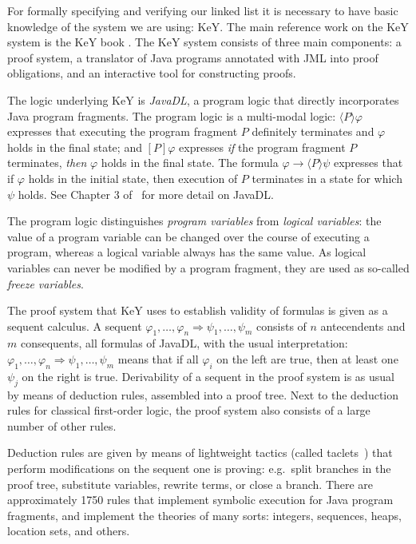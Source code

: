 \documentclass[runningheads]{llncs}
\begin{document}
For formally specifying and verifying our linked list it is necessary to have basic knowledge of the system we are using: KeY. The main reference work on the KeY system is the KeY book \cite{KeYbook}. The KeY system consists of three main components: a proof system, a translator of Java programs annotated with JML into proof obligations, and an interactive tool for constructing proofs.

The logic underlying KeY is \emph{JavaDL}, a program logic that directly incorporates Java program fragments.
The program logic is a multi-modal logic: $\langle P\rangle\varphi$ expresses that executing the program fragment $P$ definitely terminates and $\varphi$ holds in the final state; and $[P]\varphi$ expresses \emph{if} the program fragment $P$ terminates, \emph{then} $\varphi$ holds in the final state. The formula $\varphi\to\langle P\rangle\psi$ expresses that if $\varphi$ holds in the initial state, then execution of $P$ terminates in a state for which $\psi$ holds.  See Chapter 3 of~\cite{KeYbook} for more detail on JavaDL.

The program logic distinguishes \emph{program variables} from \emph{logical variables}: the value of a program variable can be changed over the course of executing a program, whereas a logical variable always has the same value. As logical variables can never be modified by a program fragment, they are used as so-called \emph{freeze variables}.

The proof system that KeY uses to establish validity of formulas is given as a sequent calculus. A sequent $\varphi_1,\ldots,\varphi_n \Rightarrow \psi_1,\ldots,\psi_m$ consists of $n$ antecendents and $m$ consequents, all formulas of JavaDL, with the usual interpretation: $\varphi_1,\ldots,\varphi_n \Rightarrow \psi_1,\ldots,\psi_m$ means that if all $\varphi_i$ on the left are true, then at least one $\psi_j$ on the right is true. Derivability of a sequent in the proof system is as usual by means of deduction rules, assembled into a proof tree. Next to the deduction rules for classical first-order logic, the proof system also consists of a large number of other rules.

Deduction rules are given by means of lightweight tactics (called taclets~\cite{beckert2004taclets}) that perform modifications on the sequent one is proving: e.g.~split branches in the proof tree, substitute variables, rewrite terms, or close a branch. There are approximately 1750 rules that implement symbolic execution for Java program fragments, and implement the theories of many sorts: integers, sequences, heaps, location sets, and others.
\end{document}
